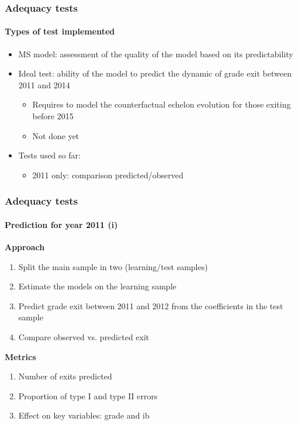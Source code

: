 \documentclass[xcolor=table,ignorenonframetext,12pt]{beamer}
\newenvironment{choixmarges}[2]{\begin{list}{}{%
\setlength{\topsep}{0pt}%
\setlength{\leftmargin}{0pt}%
\setlength{\rightmargin}{0pt}%
\setlength{\listparindent}{\parindent}%
\setlength{\itemindent}{\parindent}%
\setlength{\parsep}{0pt plus 1pt}%
\addtolength{\leftmargin}{#1}%
\addtolength{\rightmargin}{#2}%
}\item }{\end{list}}
\begin{document}
\begin{frame}
\frametitle{Adequacy tests}
\framesubtitle{Types of test implemented}
\begin{choixmarges}{-0.5cm}{-0.5cm}


\begin{itemize}

\item MS model: assessment of the quality of the model based on its predictability
\vspace{0.2cm}

\item Ideal test: ability of the model to predict the dynamic of grade exit between 2011 and 2014
	\begin{itemize}
	\item Requires to model the counterfactual echelon evolution for those exiting before 2015
	\item Not done yet
	\end{itemize}
\vspace{0.2cm}

\item Tests used so far: 
	\begin{itemize}
	\item 2011 only: comparison predicted/observed
	\end{itemize}

\end{itemize}
\end{choixmarges}

\end{frame}



\begin{frame}
\frametitle{Adequacy tests}
\framesubtitle{Prediction for year 2011 (i)}
\begin{choixmarges}{-0.5cm}{-0.5cm}

\textbf{Approach}
\begin{enumerate}
\item Split the main sample in two (learning/test samples)
\item Estimate the models on the learning sample 
\item Predict grade exit between 2011 and 2012 from the coefficients in the test sample
\item Compare observed vs. predicted exit
\end{enumerate}
\vspace{0.2cm}

\textbf{Metrics}
\begin{enumerate}
\item Number of exits predicted
\item Proportion of type I and type II errors
\item Effect on key variables: grade and ib 
\end{enumerate}

\end{choixmarges}
\end{frame}
\end{document}

